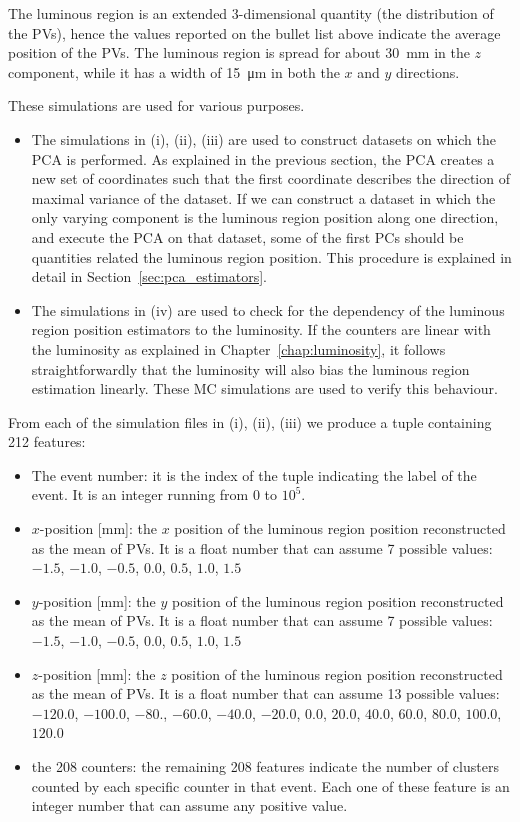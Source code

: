 The luminous region is an extended 3-dimensional quantity (the distribution of the PVs), hence the values reported on the bullet list above indicate the average position of the PVs. The luminous region is spread for about \SI{30}{\milli\meter} in the $z$ component, while it has a width of \SI{15}{\micro\meter} in both the $x$ and $y$ directions.  

These simulations are used for various purposes. 
\begin{itemize}
\item The simulations in (i), (ii), (iii) are used to construct datasets on which the PCA is performed. As explained in the previous section, the PCA creates a new set of coordinates such that the first coordinate describes the direction of maximal variance of the dataset. If we can construct a dataset in which the only varying component is the luminous region position along one direction, and execute the PCA on that dataset, some of the first PCs should be quantities related the luminous region position. This procedure is explained in detail in Section~\ref{sec:pca_estimators}.
\item The simulations in (iv) are used to check for the dependency of the luminous region position estimators to the luminosity. If the counters are linear with the luminosity as explained in Chapter~\ref{chap:luminosity}, it follows straightforwardly that the luminosity will also bias the luminous region estimation linearly. These MC simulations are used to verify this behaviour.
\end{itemize}

From each of the simulation files in (i), (ii), (iii) we produce a tuple containing 212 features:
\begin{itemize}
    \item The event number: it is the index of the tuple indicating the label of the event. It is an integer running from $0$ to $10^5$.
    \item $x$-position [mm]: the $x$ position of the luminous region position reconstructed as the mean of PVs. It is a float number that can assume 7 possible values: $-1.5$, $-1.0$, $-0.5$, $0.0$, $0.5$, $1.0$, $1.5$
    \item $y$-position [mm]: the $y$ position of the luminous region position reconstructed as the mean of PVs. It is a float number that can assume 7 possible values: $-1.5$, $-1.0$, $-0.5$, $0.0$, $0.5$, $1.0$, $1.5$
    \item $z$-position [mm]: the $z$ position of the luminous region position reconstructed as the mean of PVs. It is a float number that can assume 13 possible values: \\
    $-120.0$, $-100.0$, $-80.$, $-60.0$, $-40.0$, $-20.0$, $0.0$, $20.0$, $40.0$, $60.0$, $80.0$, $100.0$, $120.0$
    \item the 208 counters: the remaining 208 features indicate the number of clusters counted by each specific counter in that event. Each one of these feature is an integer number that can assume any positive value.
\end{itemize}

